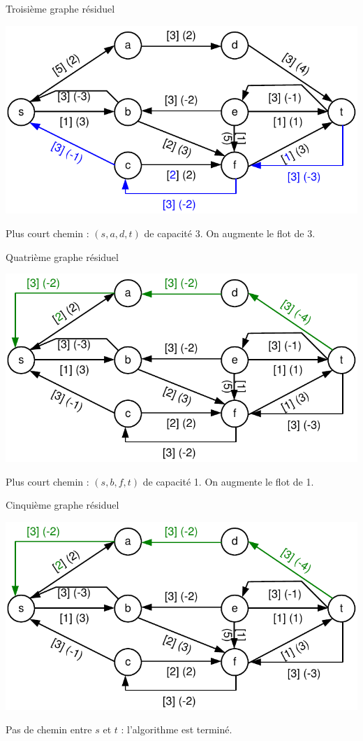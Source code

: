 \begin{frame}{Troisième graphe résiduel}
    \begin{center}
        \includegraphics[width=.8\textwidth]{fig/fmcm3.pdf}
    \end{center}

    Plus court chemin : $(s,a,d,t)$ de capacité 3. On augmente le flot de 3.
\end{frame}

\begin{frame}{Quatrième graphe résiduel}
    \begin{center}
        \includegraphics[width=.8\textwidth]{fig/fmcm4.pdf}
    \end{center}

    Plus court chemin : $(s,b,f,t)$ de capacité 1. On augmente le flot de 1.
\end{frame}

\begin{frame}{Cinquième graphe résiduel}
    \begin{center}
        \includegraphics[width=.8\textwidth]{fig/fmcm4.pdf}
    \end{center}

    Pas de chemin entre $s$ et $t$ : l'algorithme est terminé.
\end{frame}



